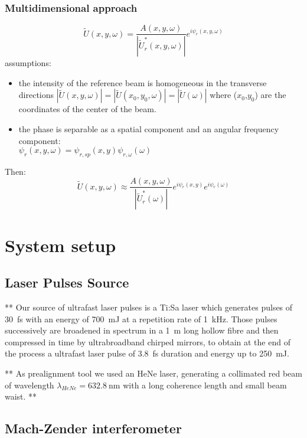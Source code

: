 \documentclass[12pt,a4paper,twoside]{article}
\begin{document}
\subsubsection{Multidimensional approach}
\begin{equation}
	\tilde{U}(x,y,\omega) = \frac{A(x,y,\omega)}{|\tilde{U}_r^*(x,y,\omega)|}e^{i\psi_r(x,y,\omega)}
\end{equation}
assumptions:
\begin{itemize}
\item the intensity of the reference beam is homogeneous in the transverse directions $|\tilde{U}(x,y,\omega)|=|\tilde{U}(x_0,y_0,\omega)|=|\tilde{U}(\omega)|$ where ($x_0$,$y_0$) are the coordinates of the center of the beam.
\item the phase is separable as a spatial component and an angular frequency component:\\ $\psi_r(x,y,\omega) = \psi_{r,sp}(x,y)\psi_{r,\omega}(\omega)$
\end{itemize}
Then:
\begin{equation}
	\tilde{U}(x,y,\omega) \approx \frac{A(x,y,\omega)}{|\tilde{U}_r^*(\omega)|}e^{i\psi_r(x,y)}e^{i\psi_r(\omega)}
\end{equation}

\section{System setup}
\subsection{Laser Pulses Source}
**
Our source of ultrafast laser pulses is a Ti:Sa laser which generates pulses of \SI{30}{\fs} with an energy of \SI{700}{\milli\J} at a repetition rate of \SI{1}{\kHz}.
Those pulses successively are broadened in spectrum in a \SI{1}{\m} long hollow fibre and then compressed in time by ultrabroadband chirped mirrors, to obtain at the end of the process a ultrafast laser pulse of \SI{3.8}{\fs} duration and energy up to \SI{250}{\milli\J}.

**
As prealignment tool we used an HeNe laser, generating a collimated red beam of wavelength $\lambda_{HeNe}=\SI{632.8}{\nm}$ with a long coherence length and small beam waist.
**
\clearpage
\subsection{Mach-Zender interferometer}

\end{document}
